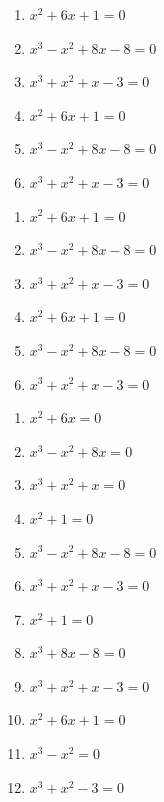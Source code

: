 \begin{exercise}
\item {}
		\begin{enumerate}[label=(\arabic{enumi}.\arabic*),leftmargin=2\parindent, align=left]
			\item $x^2+6x+1 = 0$
			\item $x^3-x^2+8x-8 = 0$
			\item $x^3+x^2+x-3 = 0$
			\item $x^2+6x+1 = 0$
			\item $x^3-x^2+8x-8 = 0$
			\item $x^3+x^2+x-3 = 0$
		\end{enumerate}
\item {}
		\begin{multicols}{2}
    		\begin{enumerate}[label=(\arabic{enumi}.\arabic*),leftmargin=2\parindent, align=left]
		        \item $x^2+6x+1 = 0$
				\item $x^3-x^2+8x-8 = 0$
				\item $x^3+x^2+x-3 = 0$
				\item $x^2+6x+1 = 0$
				\item $x^3-x^2+8x-8 = 0$
				\item $x^3+x^2+x-3 = 0$
    		\end{enumerate}
    	\end{multicols}
\item {}
		\begin{multicols}{3}
    		\begin{enumerate}[label=(\arabic{enumi}.\arabic*),leftmargin=2\parindent,align=left]
		        \item $x^2+6x = 0$
				\item $x^3-x^2+8x = 0$
				\item $x^3+x^2+x = 0$
				\item $x^2+1 = 0$
				\item $x^3-x^2+8x-8 = 0$
				\item $x^3+x^2+x-3 = 0$
				\item $x^2+1 = 0$
				\item $x^3+8x-8 = 0$
				\item $x^3+x^2+x-3 = 0$
				\item $x^2+6x+1 = 0$
				\item $x^3-x^2 = 0$
				\item $x^3+x^2-3 = 0$
    		\end{enumerate}
    	\end{multicols}
\end{exercise}
